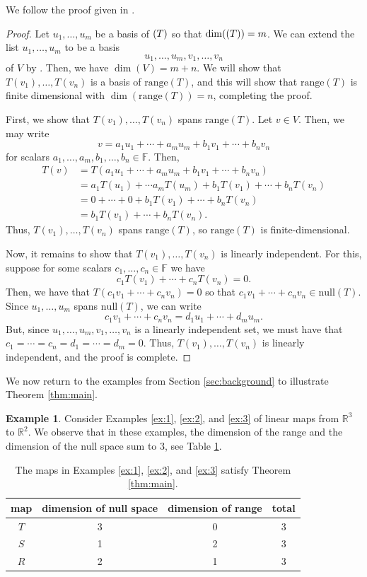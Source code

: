 \documentclass[11pt,reqno]{amsart}
\theoremstyle{definition}
\newtheorem{example}[theorem]{Example}
\newcommand{\R}{\mathbb{R}}
\newcommand{\F}{\mathbb{F}}
\newcommand{\nul}{\mathrm{null}}
\newcommand{\range}{\mathrm{range}}
\begin{document}
We follow the proof given in \cite[3.22]{axler}.

\begin{proof}
Let $u_1, \ldots, u_m$ be a basis of $\null(T)$ so that $\dim (\null(T)) = m$. We can extend the list $u_1, \ldots, u_m$ to be a basis
$$
u_1, \ldots, u_m, v_1, \ldots, v_n
$$
of $V$ by \cite[2.33]{axler}. Then, we have $\dim(V) = m+n$. We will show that $T(v_1), \ldots, T(v_n)$ is a basis of $\range(T)$, and this will show that $\range(T)$ is finite dimensional with $\dim (\range(T)) = n$, completing the proof.

First, we show that $T(v_1), \ldots, T(v_n)$ spans $\range(T)$. Let $v \in V$. Then, we may write
$$
v = a_1 u_1 + \cdots + a_mu_m + b_1 v_1 + \cdots + b_nv_n
$$
for scalars $a_1,\ldots, a_m, b_1,\ldots, b_n \in \F$. Then,
\begin{align*}
    T(v) &= T( a_1 u_1 + \cdots + a_mu_m + b_1 v_1 + \cdots + b_nv_n) \\
    &= a_1 T(u_1) + \cdots a_mT(u_m) + b_1 T(v_1) + \cdots + b_n T(v_n) \\
    &= 0 + \cdots + 0 + b_1 T(v_1) + \cdots + b_n T(v_n) \\
    &=  b_1 T(v_1) + \cdots + b_n T(v_n).
\end{align*}
Thus, $T(v_1), \ldots, T(v_n)$ spans $\range(T)$, so $\range(T)$ is finite-dimensional.

Now, it remains to show that $T(v_1), \ldots, T(v_n)$ is linearly independent. For this, suppose for some scalars $c_1, \ldots, c_n \in \F$ we have
$$
c_1T(v_1)+ \cdots +  c_nT(v_n) = 0.
$$
Then, we have that $T(c_1 v_1 + \cdots + c_n v_n) = 0$ so that $c_1 v_1 + \cdots + c_n v_n \in \nul(T)$. Since $u_1, \ldots, u_m$ spans $\nul(T)$, we can write
$$
c_1 v_1 + \cdots + c_n v_n = d_1 u_1 + \cdots + d_m u_m.
$$
But, since $u_1, \ldots, u_m, v_1, \ldots, v_n$ is a linearly independent set, we must have that $c_1 = \cdots = c_n = d_1 = \cdots = d_m = 0$. Thus, $T(v_1), \ldots, T(v_n)$ is linearly independent, and the proof is complete.
\end{proof}

We now return to the examples from Section \ref{sec:background} to illustrate Theorem \ref{thm:main}.

\begin{example}
Consider Examples \ref{ex:1}, \ref{ex:2}, and \ref{ex:3} of linear maps from $\R^3$ to $\R^2$. We observe that in these examples, the dimension of the range and the dimension of the null space sum to 3, see Table \ref{tab:ex}.

\begin{table}[h]
    \centering
    \begin{tabular}{c|c | c | c}
    map & dimension of null space & dimension of range & total \\
    \hline
 $T$ & 3 & 0 & 3 \\
 $S$ & 1 & 2 & 3 \\
 $R$ & 2 & 1 & 3
    \end{tabular}
    \caption{The maps in Examples \ref{ex:1}, \ref{ex:2}, and \ref{ex:3} satisfy Theorem \ref{thm:main}.}
    \label{tab:ex}
\end{table}
\end{example}
\end{document}
